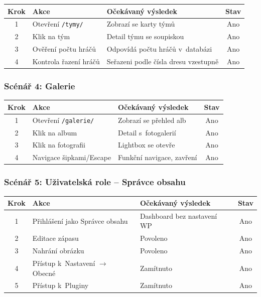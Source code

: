 \documentclass[12pt,a4paper]{article}
\begin{document}
\begin{table}[H]
\centering
\small
\begin{tabularx}{\textwidth}{c X X c}
\toprule
\textbf{Krok} & \textbf{Akce} & \textbf{Očekávaný výsledek} & \textbf{Stav} \\
\midrule
1 & Otevření \texttt{/tymy/} & Zobrazí se karty týmů & Ano \\
2 & Klik na tým & Detail týmu se soupiskou & Ano \\
3 & Ověření počtu hráčů & Odpovídá počtu hráčů v~databázi & Ano \\
4 & Kontrola řazení hráčů & Seřazeni podle čísla dresu vzestupně & Ano \\
\bottomrule
\end{tabularx}
\end{table}

\subsubsection*{Scénář 4: Galerie}

\begin{table}[H]
\centering
\small
\begin{tabularx}{\textwidth}{c X X c}
\toprule
\textbf{Krok} & \textbf{Akce} & \textbf{Očekávaný výsledek} & \textbf{Stav} \\
\midrule
1 & Otevření \texttt{/galerie/} & Zobrazí se přehled alb & Ano \\
2 & Klik na album & Detail s~fotogalerií & Ano \\
3 & Klik na fotografii & Lightbox se otevře & Ano \\
4 & Navigace šipkami/Escape & Funkční navigace, zavření & Ano \\
\bottomrule
\end{tabularx}
\end{table}

\subsubsection*{Scénář 5: Uživatelská role -- Správce obsahu}

\begin{table}[H]
\centering
\small
\begin{tabularx}{\textwidth}{c X X c}
\toprule
\textbf{Krok} & \textbf{Akce} & \textbf{Očekávaný výsledek} & \textbf{Stav} \\
\midrule
1 & Přihlášení jako Správce obsahu & Dashboard bez nastavení WP & Ano \\
2 & Editace zápasu & Povoleno & Ano \\
3 & Nahrání obrázku & Povoleno & Ano \\
4 & Přístup k~Nastavení $\rightarrow$ Obecné & Zamítnuto & Ano \\
5 & Přístup k~Pluginy & Zamítnuto & Ano \\
\bottomrule
\end{tabularx}
\end{table}
\end{document}
